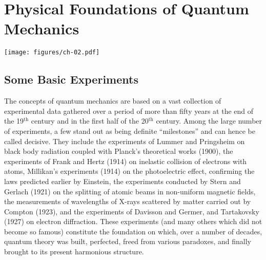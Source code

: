 \documentclass[a4paper,sfsidenotes,colorlinks=true]{tufte-book}
\numberwithin{equation}{section}
\numberwithin{figure}{section}
\begin{document}


\chapter[Physical Foundations of Quantum Mechanics]{Physical Foundations of \newline Quantum Mechanics}


\begin{figure*}%
\centering
\texttt{[image: figures/ch-02.pdf]}
\end{figure*}
\cleardoublepage

\section{Some Basic Experiments}
\label{sec-07}
The  concepts of quantum mechanics are based on a vast collection of experimental data gathered over a period of more than fifty years at the end of the 19$^{\mathrm{th}}$ century and in the first half of the 20$^{\mathrm{th}}$ century. Among the large number of experiments, a few stand out as being definite ``milestones'' and can hence be called decisive. They include the experiments of Lummer and Pringsheim on black body radiation coupled with Planck's theoretical works (1900), the experiments of Frank and Hertz (1914) on inelastic collision of electrons with atoms, Millikan's experiments (1914) on the photoelectric effect, confirming the laws predicted earlier by Einstein, the experiments conducted by Stern and Gerlach (1921) on the splitting of atomic beams in non-uniform magnetic fields, the measurements of wavelengths of X-rays scattered by matter carried out by Compton (1923), and the experiments of Davisson and Germer, and Tartakovsky (1927) on electron diffraction. These experiments (and many others which did not become so famous) constitute the foundation on which, over a number of decades, quantum theory was built, perfected, freed from various paradoxes, and finally brought to its present harmonious structure. 
\end{document}
